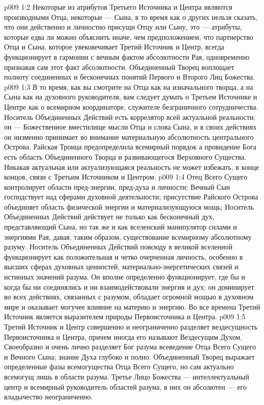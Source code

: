 \vs p009 1:2 Некоторые из атрибутов Третьего Источника и Центра являются производными Отца, некоторые --- Сына, в то время как о других нельзя сказать, что они действенно и личностно присущи Отцу или Сыну, это --- атрибуты, которые едва ли можно объяснить иначе, чем предположением, что партнерство Отца и Сына, которое увековечивает Третий Источник и Центр, всегда функционирует в гармонии с вечным фактом абсолютности Рая, одновременно признавая сам этот факт абсолютности. Объединенный Творец воплощает полноту соединенных и бесконечных понятий Первого и Второго Лиц Божества.
\vs p009 1:3 \pc В то время, как вы смотрите на Отца как на изначального творца, а на Сына как на духовного руководителя, вам следует думать о Третьем Источнике и Центре как о всемирном координаторе, служителе безграничного сотрудничества. Носитель Объединенных Действий есть коррелятор всей актуальной реальности; он --- Божественное вместилище мысли Отца и слова Сына, и в своих действиях он низменно принимает во внимание материальную абсолютность центрального Острова. Райская Троица предопределила всемирный порядок  а провидение Бога есть область Объединенного Творца и развивающегося Верховного Существа. Никакая актуальная или актуализующаяся реальность не может избежать, в конце концов, связи с Третьим Источником и Центром.
\vs p009 1:4 \pc Отец Всего Сущего контролирует области пред\hyp{}энергии, пред\hyp{}духа и личности; Вечный Сын господствует над сферами духовной деятельности; присутствие Райского Острова объединяет область физической энергии и материализующуюся мощь; Носитель Объединенных Действий действует не только как бесконечный дух, представляющий Сына, но так же и как вселенский манипулятор силами и энергиями Рая, давая, таким образом, существование всемирному абсолютному разуму. Носитель Объединенных Действий повсюду в великой вселенной функционирует как положительная и четко очерченная личность, особенно в высших сферах духовных ценностей, материально\hyp{}энергетических связей и истинных значений разума. Он вполне определенно функционирует, где бы и когда бы ни соединялись и ни взаимодействовали энергия и дух; он доминирует во всех действиях, связанных с разумом, обладает огромной мощью в духовном мире и оказывает могучее влияние на материю и энергию. Во все времена Третий Источник является выразителем природы Первоисточника и Центра.
\vs p009 1:5 \pc Третий Источник и Центр совершенно и неограниченно разделяет вездесущность Первоисточника и Центра, причем иногда его называют Вездесущим Духом. Своеобразно и очень лично разделяет Бог разума всеведение Отца Всего Сущего и Вечного Сына; знание Духа глубоко и полно. Объединенный Творец выражает определенные фазы всемогущества Отца Всего Сущего, но сам актуально всемогущ лишь в области разума. Третье Лицо Божества --- интеллектуальный центр и всемирный руководитель областей разума, в них он абсолютен --- его владычество неограниченно.
